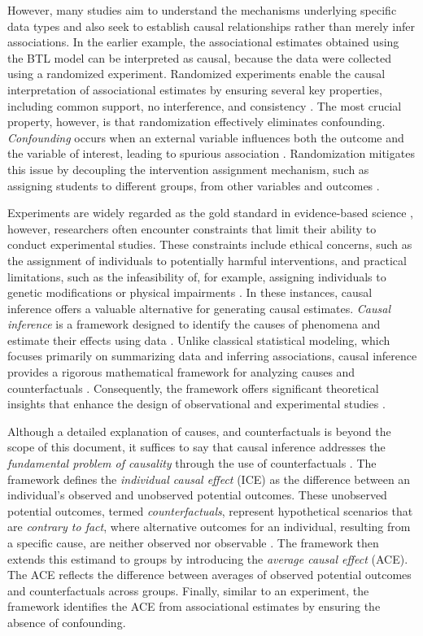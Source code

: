 \documentclass[
  authoryear,
  preprint,
  1p]{elsarticle}
\begin{document}
However, many studies aim to understand the mechanisms underlying
specific data types and also seek to establish causal relationships
rather than merely infer associations. In the earlier example, the
associational estimates obtained using the BTL model can be interpreted
as causal, because the data were collected using a randomized
experiment. Randomized experiments enable the causal interpretation of
associational estimates by ensuring several key properties, including
common support, no interference, and consistency
\citep{Morgan_et_al_2014, Neal_2020}. The most crucial property,
however, is that randomization effectively eliminates confounding.
\emph{Confounding} occurs when an external variable influences both the
outcome and the variable of interest, leading to spurious association
\citep{Everitt_et_al_2010}. Randomization mitigates this issue by
decoupling the intervention assignment mechanism, such as assigning
students to different groups, from other variables and outcomes
\citep{Morgan_et_al_2014, Neal_2020}.

Experiments are widely regarded as the gold standard in evidence-based
science \citep{Hariton_et_al_2018, Hansson_2014}, however, researchers
often encounter constraints that limit their ability to conduct
experimental studies. These constraints include ethical concerns, such
as the assignment of individuals to potentially harmful interventions,
and practical limitations, such as the infeasibility of, for example,
assigning individuals to genetic modifications or physical impairments
\citep{Neal_2020}. In these instances, causal inference offers a
valuable alternative for generating causal estimates. \emph{Causal
inference} is a framework designed to identify the causes of phenomena
and estimate their effects using data
\citep{Shaughnessy_et_al_2010, Neal_2020}. Unlike classical statistical
modeling, which focuses primarily on summarizing data and inferring
associations, causal inference provides a rigorous mathematical
framework for analyzing causes and counterfactuals \citep{Pearl_2009}.
Consequently, the framework offers significant theoretical insights that
enhance the design of observational and experimental studies
\citep{McElreath_2020}.

Although a detailed explanation of causes, and counterfactuals is beyond
the scope of this document, it suffices to say that causal inference
addresses the \emph{fundamental problem of causality} through the use of
counterfactuals \citep{Neal_2020}. The framework defines the
\emph{individual causal effect} (ICE) as the difference between an
individual's observed and unobserved potential outcomes. These
unobserved potential outcomes, termed \emph{counterfactuals}, represent
hypothetical scenarios that are \emph{contrary to fact}, where
alternative outcomes for an individual, resulting from a specific cause,
are neither observed nor observable
\citep{Neal_2020, Counterfactual_2024}. The framework then extends this
estimand to groups by introducing the \emph{average causal effect}
(ACE). The ACE reflects the difference between averages of observed
potential outcomes and counterfactuals across groups. Finally, similar
to an experiment, the framework identifies the ACE from associational
estimates by ensuring the absence of confounding.
\end{document}
